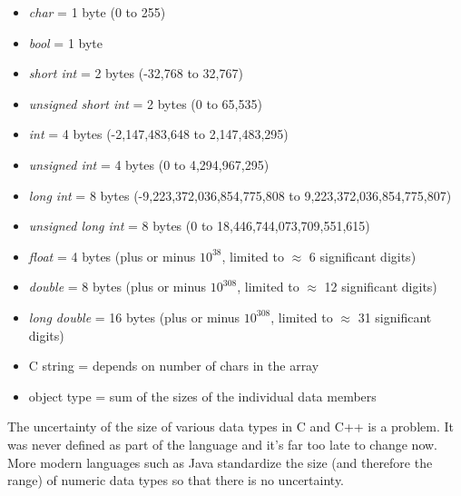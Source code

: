 \documentclass{report}
\begin{document}
\begin{itemize}
  \item \textit{char} = 1 byte (0 to 255)
  \item \textit{bool} = 1 byte
  \item \textit{short int} = 2 bytes (-32,768 to 32,767)
  \item \textit{unsigned short int} = 2 bytes (0 to 65,535)
  \item \textit{int} = 4 bytes (-2,147,483,648  to 2,147,483,295)
  \item \textit{unsigned int} = 4 bytes (0 to 4,294,967,295)
  \item \textit{long int} = 8 bytes (-9,223,372,036,854,775,808 to 9,223,372,036,854,775,807)
  \item \textit{unsigned long int} = 8 bytes (0 to 18,446,744,073,709,551,615)
  \item \textit{float} = 4 bytes (plus or minus $10^{38}$, limited to $\approx$ 6 significant digits) 
  \item \textit{double} = 8 bytes (plus or minus $10^{308}$, limited to $\approx$ 12 significant digits)
  \item \textit{long double} = 16 bytes (plus or minus $10^{308}$, limited to $\approx$ 31 significant digits)
  \item C string = depends on number of chars in the array
  \item object type = sum of the sizes of the individual data members
\end{itemize}
\bigbreak \noindent
The uncertainty of the size of various data types in C and C++ is a problem. It was never defined as part of the language and it's far too late to change now. More modern languages such as Java standardize the size (and therefore the range) of numeric data types so that there is no uncertainty.
\clearpage
\end{document}
